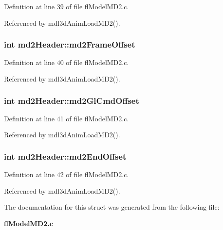 Definition at line 39 of file fl\-Model\-MD2.c.

Referenced by mdl3d\-Anim\-Load\-MD2().
\subsubsection{\setlength{\rightskip}{0pt plus 5cm}int {\bf md2Header::md2Frame\-Offset}}\label{structmd2Header_afe3b02bd33d0b4ba6e502d15e56bf58}




Definition at line 40 of file fl\-Model\-MD2.c.

Referenced by mdl3d\-Anim\-Load\-MD2().
\subsubsection{\setlength{\rightskip}{0pt plus 5cm}int {\bf md2Header::md2Gl\-Cmd\-Offset}}\label{structmd2Header_b886e208846471c025a76b616c5016a5}




Definition at line 41 of file fl\-Model\-MD2.c.

Referenced by mdl3d\-Anim\-Load\-MD2().
\subsubsection{\setlength{\rightskip}{0pt plus 5cm}int {\bf md2Header::md2End\-Offset}}\label{structmd2Header_12bca8aa60008c2c507cb5cd749f185d}




Definition at line 42 of file fl\-Model\-MD2.c.

Referenced by mdl3d\-Anim\-Load\-MD2().

The documentation for this struct was generated from the following file:\begin{CompactItemize}
\item 
{\bf fl\-Model\-MD2.c}\end{CompactItemize}

